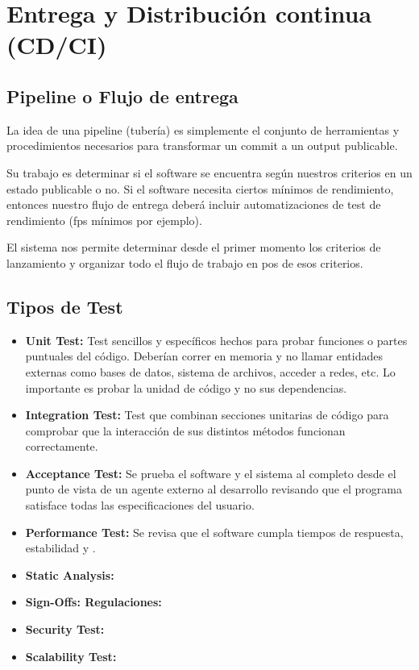 
\section{Entrega y Distribución continua (CD/CI)}\label{cdci:entrega-continua}

\subsection{Pipeline o Flujo de entrega}\label{cdci:flujo-de-entrega}

La idea de una pipeline (tubería) es simplemente el conjunto de herramientas y
procedimientos necesarios para transformar un commit a un output publicable.

Su trabajo es determinar si el software se encuentra según nuestros criterios
en un estado publicable o no. Si el software necesita ciertos mínimos de
rendimiento, entonces nuestro flujo de entrega deberá incluir automatizaciones
de test de rendimiento (fps mínimos por ejemplo).

El sistema nos permite determinar desde el primer momento los criterios de
lanzamiento y organizar todo el flujo de trabajo en pos de esos criterios.

\subsection{Tipos de Test}\label{cdci:tipos-de-test}

\begin{itemize}
  \item \textbf{Unit Test:} Test sencillos y específicos hechos para probar funciones o partes puntuales del código. Deberían correr en memoria y no llamar entidades externas como bases de datos, sistema de archivos, acceder a redes, etc. Lo importante es probar la unidad de código y no sus dependencias.
  \item \textbf{Integration Test:} Test que combinan secciones unitarias de código para comprobar que la interacción de sus distintos métodos funcionan correctamente.
  \item \textbf{Acceptance Test:} Se prueba el software y el sistema al completo desde el punto de vista de un agente externo al desarrollo revisando que el programa satisface todas las especificaciones del usuario.
  \item \textbf{Performance Test:} Se revisa que el software cumpla tiempos de respuesta, estabilidad y .
  \item \textbf{Static Analysis:} 
  \item \textbf{Sign-Offs: Regulaciones:} 
  \item \textbf{Security Test:} 
  \item \textbf{Scalability Test:} 
\end{itemize}

